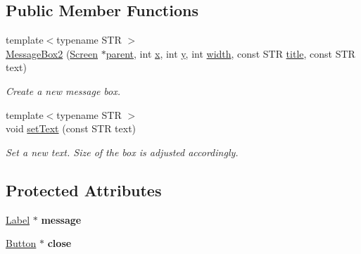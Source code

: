 \subsection*{Public Member Functions}
\begin{DoxyCompactItemize}
\item 
\hypertarget{classGUI_1_1MessageBox2_a106f58b4e83d3a9ecd2d07d5d9ab82d6}{{\footnotesize template$<$typename S\-T\-R $>$ }\\\hyperlink{classGUI_1_1MessageBox2_a106f58b4e83d3a9ecd2d07d5d9ab82d6}{Message\-Box2} (\hyperlink{classGUI_1_1Screen}{Screen} $\ast$\hyperlink{classGUI_1_1Window_a2e593ff65e7702178d82fe9010a0b539}{parent}, int \hyperlink{classGUI_1_1Window_a6ca6a80ca00c9e1d8ceea8d3d99a657d}{x}, int \hyperlink{classGUI_1_1Window_a0ee8e923aff2c3661fc2e17656d37adf}{y}, int \hyperlink{classGUI_1_1Window_a6cd42974c2b9239d05dac79d284f427d}{width}, const S\-T\-R \hyperlink{classGUI_1_1ToplevelWindow_a04de191f9a57b5b584657866a4ac6843}{title}, const S\-T\-R text)}\label{classGUI_1_1MessageBox2_a106f58b4e83d3a9ecd2d07d5d9ab82d6}

\begin{DoxyCompactList}\small\item\em Create a new message box. \end{DoxyCompactList}\item 
\hypertarget{classGUI_1_1MessageBox2_a00218125eac06f18b1c4c4c2447315bf}{{\footnotesize template$<$typename S\-T\-R $>$ }\\void \hyperlink{classGUI_1_1MessageBox2_a00218125eac06f18b1c4c4c2447315bf}{set\-Text} (const S\-T\-R text)}\label{classGUI_1_1MessageBox2_a00218125eac06f18b1c4c4c2447315bf}

\begin{DoxyCompactList}\small\item\em Set a new text. Size of the box is adjusted accordingly. \end{DoxyCompactList}\end{DoxyCompactItemize}
\subsection*{Protected Attributes}
\begin{DoxyCompactItemize}
\item 
\hypertarget{classGUI_1_1MessageBox2_ad92a769376304d84d69e90614b2b64d8}{\hyperlink{classGUI_1_1Label}{Label} $\ast$ {\bfseries message}}\label{classGUI_1_1MessageBox2_ad92a769376304d84d69e90614b2b64d8}

\item 
\hypertarget{classGUI_1_1MessageBox2_ab17891fbe30f8b0f2f51038c9b1e2dbe}{\hyperlink{classGUI_1_1Button}{Button} $\ast$ {\bfseries close}}\label{classGUI_1_1MessageBox2_ab17891fbe30f8b0f2f51038c9b1e2dbe}

\end{DoxyCompactItemize}


